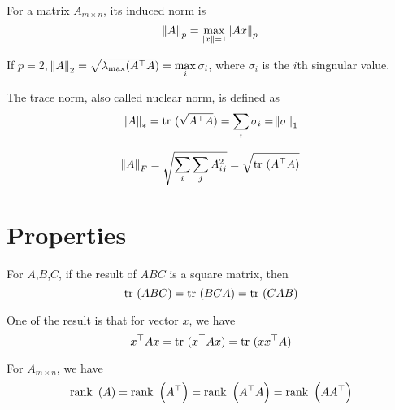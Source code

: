 \begin{definition}
   For a matrix $A_{m \times n}$, its induced norm is
\begin{equation}
    \norm{A}_p = \max\limits_{\norm{x}=1} \norm{Ax}_p
\end{equation}

If $p=2$, $\norm{A}_2 = \sqrt{\lambda_{\mathrm{max}} ( {A}^\top A}) = \max\limits_i \sigma_i$, where $\sigma_i$ is the $i$th singnular value.
 
\end{definition}

\begin{definition}
    The trace norm, also called nuclear norm, is defined as
\begin{equation}
    \norm{A}_* = \displaystyle \mathrm{tr}~( \sqrt{{A}^\top A} ) = \sum_i \sigma_i = \norm{\sigma}_1
\end{equation}
\end{definition}

\begin{definition}
    \begin{equation}
        \norm{A}_F = \sqrt{\sum_i \sum_j A_{ij}^2} = \sqrt{\displaystyle \mathrm{tr}~( {A}^\top A )}
    \end{equation}
\end{definition}


\section{Properties}

\begin{theorem}
    For $A$,$B$,$C$, if the result of $ABC$ is a square matrix, then
    \begin{equation}
        \displaystyle \mathrm{tr}~( ABC ) = \displaystyle \mathrm{tr}~( BCA ) = \displaystyle \mathrm{tr}~( CAB )
    \end{equation}
    
    One of the result is that for vector $x$, we have
    \begin{equation}
        {x}^\top A x = \displaystyle \mathrm{tr}~( {x}^\top Ax ) = \displaystyle \mathrm{tr}~( x {x}^\top A )
    \end{equation}
\end{theorem}

\begin{theorem}
    For $A_{m \times n}$, we have
    \begin{equation}
        \displaystyle \mathrm{rank}~\left( A \right) = \displaystyle \mathrm{rank}~\left( {A}^\top \right) = \displaystyle \mathrm{rank}~\left( {A}^\top A \right) = \displaystyle \mathrm{rank}~\left( A {A}^\top \right)
    \end{equation}    
\end{theorem}


